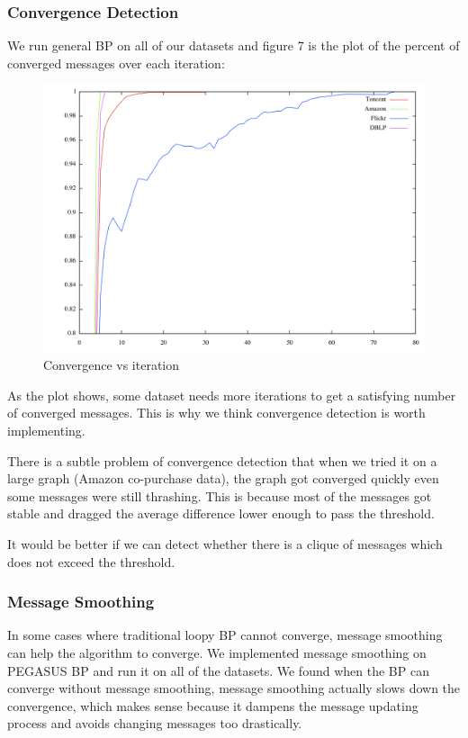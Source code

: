 \subsubsection{Convergence Detection}
We run general BP on all of our datasets and figure 7 is the plot of the percent of converged messages over each iteration:
\begin{figure}[!ht]
\centering
\begin{minipage}[b]{0.5\linewidth}
\centering
\includegraphics[width=\textwidth]{FIG/Converge.png}
\caption{Convergence vs iteration}
\end{minipage}
\end{figure}	

As the plot shows, some dataset needs more iterations to get a satisfying number of converged messages. This is why we think convergence detection is worth implementing.

There is a subtle problem of convergence detection that when we tried it on a large graph (Amazon co-purchase data), the graph got converged quickly even some messages were still thrashing. This is because most of the messages got stable and dragged the average difference lower enough to pass the threshold.

It would be better if we can detect whether there is a clique of messages which does not exceed the threshold.

\subsubsection{Message Smoothing}
In some cases where traditional loopy BP cannot converge, message smoothing can help the algorithm to converge. We implemented message smoothing on PEGASUS BP and run it on all of the datasets. We found when the BP can converge without message smoothing, message smoothing actually slows down the convergence, which makes sense because it dampens the message updating process and avoids changing messages too drastically. 


